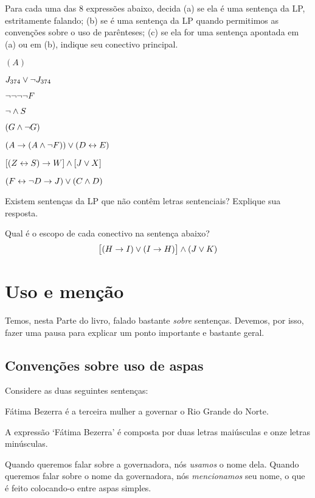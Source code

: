 \solutions
\problempart
\label{pr.wiffTFL}
Para cada uma das $8$ expressões abaixo, decida (a) se ela é uma sentença da LP, estritamente falando; (b) se é uma sentença da LP quando permitimos as convenções sobre o uso de parênteses; (c) se ela for uma sentença apontada em (a) ou em (b), indique seu conectivo principal.
\begin{earg}
\item $(A)$
\item $J_{374} \vee \neg J_{374}$
\item $\neg \neg \neg \neg F$
\item $\neg \wedge S$
\item $(G \wedge \neg G)$
\item $(A \rightarrow (A \wedge \neg F)) \vee (D \leftrightarrow E)$
\item $[(Z \leftrightarrow S) \rightarrow W] \wedge [J \vee X]$
\item $(F \leftrightarrow \neg D \rightarrow J) \vee (C \wedge D)$
\end{earg}

\problempart
Existem sentenças da LP que não contêm letras sentenciais? Explique sua resposta.

\problempart
Qual é o escopo de cada conectivo na sentença abaixo?
$$\bigl[(H \rightarrow I) \vee (I \rightarrow H)\bigr] \wedge (J \vee K)$$


\chapter{Uso e menção}\label{s:UseMention}
Temos, nesta Parte do livro, falado bastante \emph{sobre} sentenças.
Devemos, por isso, fazer uma pausa para explicar um ponto importante e bastante geral.

\section{Convenções sobre uso de aspas}
Considere as duas seguintes sentenças:
	\begin{ebullet}
		\item Fátima Bezerra é a terceira mulher a governar o Rio Grande do Norte.
		\item A expressão `Fátima Bezerra' é composta por duas letras maiúsculas e onze letras minúsculas.
	\end{ebullet}
Quando queremos falar sobre a governadora, nós \emph{usamos} o nome dela.
Quando queremos falar sobre o nome da governadora, nós \emph{mencionamos} seu nome, o que é feito colocando-o entre aspas simples.

